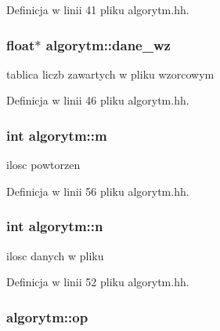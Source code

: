 \-Definicja w linii 41 pliku algorytm.\-hh.

\hypertarget{classalgorytm_a93fb0f7a64eb1e4f8492445395f98e5f}{
\subsubsection[{dane\-\_\-wz}]{\setlength{\rightskip}{0pt plus 5cm}float$\ast$ {\bf algorytm\-::dane\-\_\-wz}}}\label{classalgorytm_a93fb0f7a64eb1e4f8492445395f98e5f}


tablica liczb zawartych w pliku wzorcowym 



\-Definicja w linii 46 pliku algorytm.\-hh.

\hypertarget{classalgorytm_ac9429e88b0630a008df4d011458ee5a2}{
\subsubsection[{m}]{\setlength{\rightskip}{0pt plus 5cm}int {\bf algorytm\-::m}}}\label{classalgorytm_ac9429e88b0630a008df4d011458ee5a2}


ilosc powtorzen 



\-Definicja w linii 56 pliku algorytm.\-hh.

\hypertarget{classalgorytm_a2778c37f0ec06a30b7d494501c40e91a}{
\subsubsection[{n}]{\setlength{\rightskip}{0pt plus 5cm}int {\bf algorytm\-::n}}}\label{classalgorytm_a2778c37f0ec06a30b7d494501c40e91a}


ilosc danych w pliku 



\-Definicja w linii 52 pliku algorytm.\-hh.

\hypertarget{classalgorytm_aedaee1aa41206b5f050fe660d0846f2d}{
\subsubsection[{op}]{ {\bf algorytm\-::op}}}\label{classalgorytm_aedaee1aa41206b5f050fe660d0846f2d}


